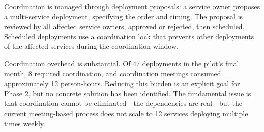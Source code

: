 Coordination is managed through deployment proposals: a service owner proposes a multi-service deployment, specifying the order and timing. The proposal is reviewed by all affected service owners, approved or rejected, then scheduled. Scheduled deployments use a coordination lock that prevents other deployments of the affected services during the coordination window.

Coordination overhead is substantial. Of 47 deployments in the pilot's final month, 8 required coordination, and coordination meetings consumed approximately 12 person-hours. Reducing this burden is an explicit goal for Phase 2, but no concrete solution has been identified. The fundamental issue is that coordination cannot be eliminated—the dependencies are real—but the current meeting-based process does not scale to 12 services deploying multiple times weekly.
